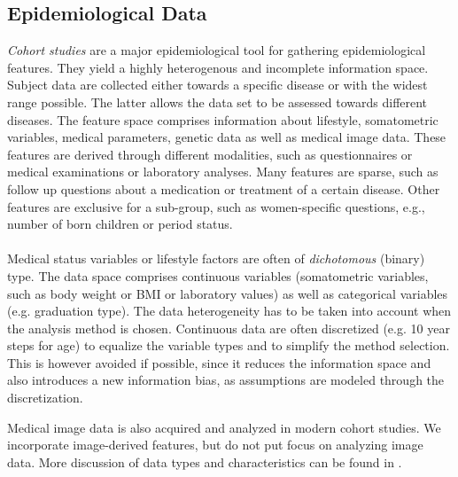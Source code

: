 \documentclass[journal]{style/vgtc} 			          %
\newcommand{\com}[1]{\textcolor{orange}{\uline{#1}}}
\begin{document}
\subsection{Epidemiological Data} \label{sec:EpidemiologicalData}
\emph{Cohort studies} are a major epidemiological tool for gathering epidemiological features.
They yield a highly heterogenous and incomplete information space.
Subject data are collected either towards a specific disease or with the widest range possible.
The latter allows the data set to be assessed towards different diseases.
The feature space comprises information about lifestyle, somatometric variables, medical parameters, genetic data as well as medical image data.
These features are derived through different modalities, such as questionnaires or medical examinations or laboratory analyses.
Many features are sparse, such as follow up questions about a medication or treatment of a certain disease.
Other features are exclusive for a sub-group, such as women-specific questions, e.g., number of born children or period status.
\\\\
Medical status variables or lifestyle factors are often of \emph{dichotomous} (binary) type.
The data space comprises continuous variables (somatometric variables, such as body weight or BMI or laboratory values) as well as categorical variables (e.g. graduation type).
The data heterogeneity has to be taken into account when the analysis method is chosen.
Continuous data are often discretized (e.g. 10 year steps for age) to equalize the variable types and to simplify the method selection.
This is however avoided if possible, since it reduces the information space and also introduces a new information bias, as assumptions are modeled through the discretization.

Medical image data is also acquired and analyzed in modern cohort studies.
We incorporate image-derived features, but do not put focus on analyzing image data.
More discussion of data types and characteristics can be found in \cite{Klemm2014VIS, Toennies2015, Preim2014}.
\end{document}
